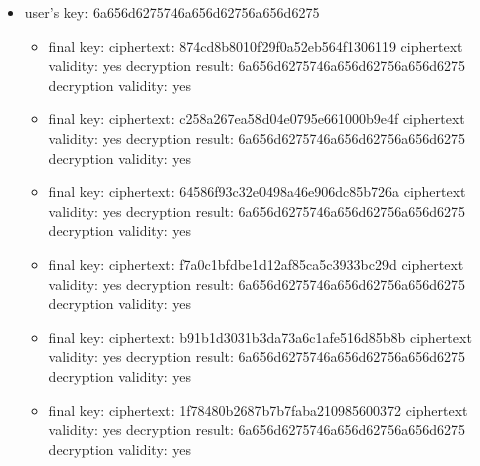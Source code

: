\begin{itemize}
  \item user's key: 6a656d6275746a656d62756a656d6275
  \begin{itemize}
    \item final key: \newline
    ciphertext: 874cd8b8010f29f0a52eb564f1306119\newline
    ciphertext validity: yes\newline
    decryption result: 6a656d6275746a656d62756a656d6275\newline
    decryption validity: yes
    \item final key: \newline
    ciphertext: c258a267ea58d04e0795e661000b9e4f\newline
    ciphertext validity: yes\newline
    decryption result: 6a656d6275746a656d62756a656d6275\newline
    decryption validity: yes
    \item final key: \newline
    ciphertext: 64586f93c32e0498a46e906dc85b726a\newline
    ciphertext validity: yes\newline
    decryption result: 6a656d6275746a656d62756a656d6275\newline
    decryption validity: yes
    \item final key: \newline
    ciphertext: f7a0c1bfdbe1d12af85ca5c3933bc29d\newline
    ciphertext validity: yes\newline
    decryption result: 6a656d6275746a656d62756a656d6275\newline
    decryption validity: yes
    \item final key: \newline
    ciphertext: b91b1d3031b3da73a6c1afe516d85b8b\newline
    ciphertext validity: yes\newline
    decryption result: 6a656d6275746a656d62756a656d6275\newline
    decryption validity: yes
    \item final key: \newline
    ciphertext: 1f78480b2687b7b7faba210985600372\newline
    ciphertext validity: yes\newline
    decryption result: 6a656d6275746a656d62756a656d6275\newline
    decryption validity: yes
  \end{itemize}

\end{itemize}

